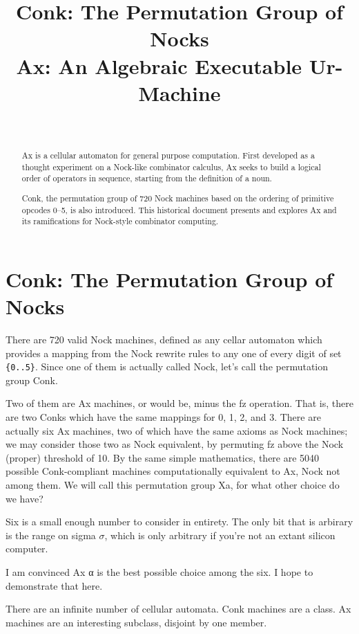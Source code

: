 \documentclass[twoside]{article}
\title{Conk:  The Permutation 
Group of Nocks \\ Ax:  An Algebraic Executable Ur-Machine}
\author{\authorname~\authorpatp \\ \affiliation}
\date{}
\begin{document}
\maketitle
\thispagestyle{firststyle}

\begin{abstract}
Ax is a cellular automaton for general purpose computation.  First developed as a thought experiment on a Nock-like combinator calculus, Ax seeks to build a logical order of operators in sequence, starting from the definition of a noun.

Conk, the permutation group of 720 Nock machines based on the ordering of primitive opcodes 0--5, is also introduced.  This historical document presents and explores Ax and its ramifications for Nock-style combinator computing.
\end{abstract}

\setcounter{page}{1}

\tableofcontents

\section{Conk:  The Permutation Group of Nocks}

There are 720 valid Nock machines, defined as any cellar auto\-maton which provides a mapping from the Nock rewrite rules to any one of every digit of set \texttt{\{0..5\}}. Since one of them is actually called Nock, let's call the permutation group Conk.

Two of them are Ax machines, or would be, minus the fz operation. That is, there are two Conks which have the same mappings for 0, 1, 2, and 3. There are actually six Ax machines, two of which have the same axioms as Nock machines; we may consider those two as Nock equivalent, by permuting fz above the Nock (proper) threshold of 10. By the same simple mathematics, there are 5040 possible Conk-compliant machines computationally equivalent to Ax, Nock not among them. We will call this permutation group Xa, for what other choice do we have?

Six is a small enough number to consider in entirety. The only bit that is arbirary is the range on sigma $\sigma$, which is only arbitrary if you're not an extant silicon computer.

I am convinced Ax α is the best possible choice among the six. I hope to demonstrate that here.

There are an infinite number of cellular automata. Conk machines are a class. Ax machines are an interesting subclass, disjoint by one member.
\end{document}
